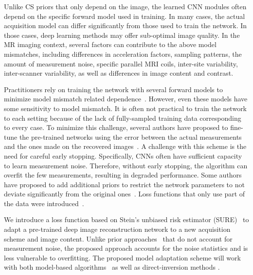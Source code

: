 \documentclass{article}
\begin{document}
Unlike CS priors that only depend on the image, the learned CNN modules often depend on the specific forward model used in training. In many cases, the actual acquisition model can differ significantly from those used to train the network. In those cases, deep learning methods may offer sub-optimal image quality. In the MR imaging context, several factors can contribute to the above model mismatches, including differences in acceleration factors, sampling patterns, the amount of measurement noise, specific parallel MRI coils, inter-site variability, inter-scanner variability, as well as differences in image content and contrast.

Practitioners rely on training the network with several forward models to minimize model mismatch related dependence~\cite{modl,sigmanet,gan_cyclic,dagan,casecadeDynamic}. However, even these models have some sensitivity to model mismatch. It is often not practical to train the network to each setting because of the lack of fully-sampled training data corresponding to every case. To minimize this challenge, several authors have proposed to fine-tune the pre-trained networks using the error between the actual measurements and the ones made on the recovered images~\cite{dip2018}. A challenge with this scheme is the need for careful early stopping. Specifically, CNNs often have sufficient capacity to learn measurement noise. Therefore,  without early stopping, the algorithm can overfit the few measurements, resulting in degraded performance. Some authors have proposed to add additional priors to restrict the network parameters to not deviate significantly from the original ones~\cite{sigmanet}. Loss functions that only use part of the data were introduced~\cite{ssduft}.

We introduce a loss function based on Stein's unbiased risk estimator (SURE)~\cite{sure} to adapt a pre-trained deep image reconstruction network to a new acquisition scheme and image content. Unlike prior approaches~\cite{sigmanet,dip2018,ssduft} that do not account for measurement noise, the proposed approach accounts for the noise statistics and is less vulnerable to overfitting. The proposed model adaptation scheme will work with both model-based algorithms~\cite{modl,hammernik} as well as direct-inversion methods \cite{jong2019kspace,ronneberger2015unet}. 
\end{document}

